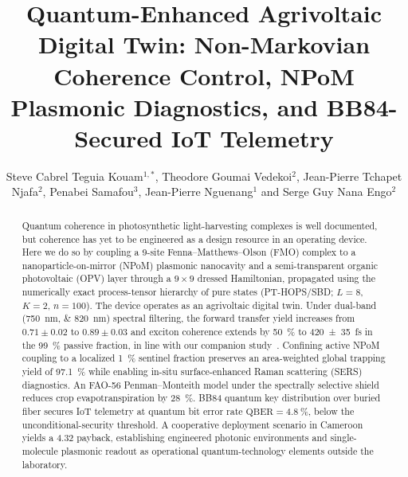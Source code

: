 \documentclass[12pt]{iopart}
\begin{document}
\title[Quantum-Enhanced Agrivoltaic Digital Twin]{Quantum-Enhanced Agrivoltaic Digital Twin: Non-Markovian Coherence Control, NPoM Plasmonic Diagnostics, and BB84-Secured IoT Telemetry}

\author{Steve Cabrel Teguia Kouam$^{1,*}$, Theodore Goumai Vedekoi$^{2}$, Jean-Pierre Tchapet Njafa$^{2}$, Penabei Samafou$^{3}$, Jean-Pierre Nguenang$^{1}$ and Serge Guy Nana Engo$^{2}$}

\address{$^{1}$ Department of Physics, Faculty of Science, University of Douala, Douala, Cameroon}
\address{$^{2}$ Department of Physics, Faculty of Science, University of Yaound\'{e} I, Yaound\'{e}, Cameroon}
\address{$^{3}$ Department of Medical Imaging and Radiation Sciences, Faculty of Medicine and Health Sciences, Université de Sherbrooke, Sherbrooke, QC J1H 5N4, Canada}

\submitto{\QST}



\begin{abstract}
Quantum coherence in photosynthetic light-harvesting complexes is well documented, but coherence has yet to be engineered as a design resource in an operating device. Here we do so by coupling a 9-site Fenna--Matthews--Olson (FMO) complex to a nanoparticle-on-mirror (NPoM) plasmonic nanocavity and a semi-transparent organic photovoltaic (OPV) layer through a $9\times 9$ dressed Hamiltonian, propagated using the numerically exact process-tensor hierarchy of pure states (PT-HOPS/SBD; $L=8$, $K=2$, $n=100$). The device operates as an agrivoltaic digital twin. Under dual-band (\qtylist{750;820}{\nm}) spectral filtering, the forward transfer yield increases from $0.71\pm 0.02$ to $0.89\pm 0.03$ and exciton coherence extends by \qty{50}{\percent} to \qty{420 \pm 35}{\fs} in the \qty{99}{\percent} passive fraction, in line with our companion study~\cite{Kouam2026}. Confining active NPoM coupling to a localized \qty{1}{\percent} sentinel fraction preserves an area-weighted global trapping yield of \qty{97.1}{\percent} while enabling in-situ surface-enhanced Raman scattering (SERS) diagnostics. An FAO-56 Penman--Monteith model under the spectrally selective shield reduces crop evapotranspiration by \qty{28}{\percent}. BB84 quantum key distribution over buried fiber secures IoT telemetry at quantum bit error rate $\mathrm{QBER}=\qty{4.8}{\percent}$, below the unconditional-security threshold. A cooperative deployment scenario in Cameroon yields a \qty{4.32}{\yr} payback, establishing engineered photonic environments and single-molecule plasmonic readout as operational quantum-technology elements outside the laboratory.
\end{abstract}
\end{document}
